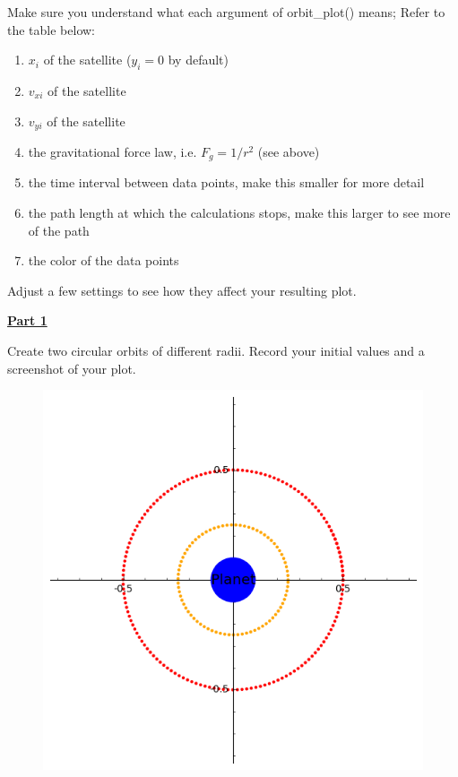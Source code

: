 %
Make sure you understand what each argument of orbit\_plot() means;
Refer to the table below:
\begin{enumerate}
  \item $x_i$ of the satellite ($y_i = 0$ by default)
  \item $v_{xi}$ of the satellite
  \item $v_{yi}$ of the satellite
  \item the gravitational force law, i.e. $F_g = 1/r^2$ (see above)
  \item the time interval between data points, make this smaller for more detail
  \item the path length at which the calculations stops, make this larger to see more of the path
  \item the color of the data points
\end{enumerate}
Adjust a few settings to see how they affect your resulting plot.
\hfill \break

\underline{\textbf{Part 1}} \par
Create two circular orbits of different radii.
Record your initial values and a screenshot of your plot.
%
\begin{figure}[H]
\includegraphics[scale=0.60]{figures/orbits/part1.png}
\end{figure}

